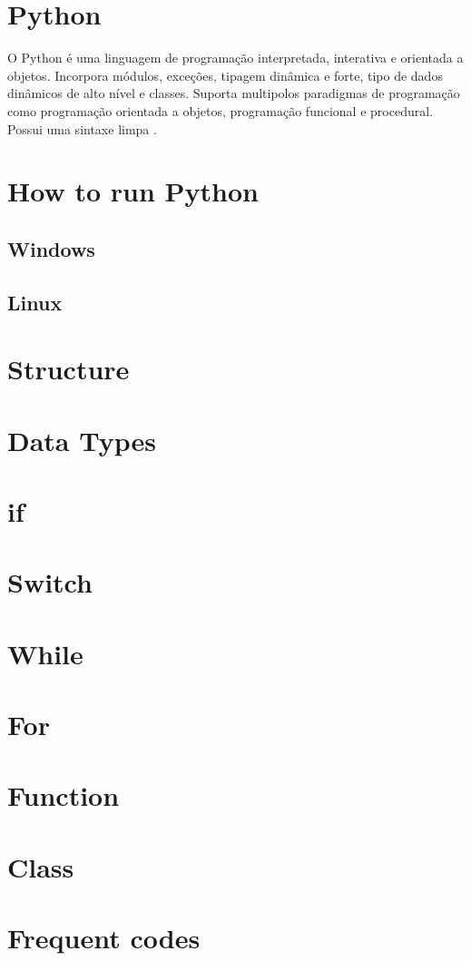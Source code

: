 \chapter{Python}

O Python é uma linguagem de programação interpretada, interativa e orientada a objetos. Incorpora módulos, exceções, tipagem dinâmica e forte, tipo de dados  dinâmicos de alto nível e classes. Suporta multipolos paradigmas de programação como programação orientada a objetos, programação funcional e procedural. Possui uma sintaxe limpa \cite{pythonDocs}.

\chapter{How to run Python}
\section{Windows}
\section{Linux}
\chapter{Structure}
\chapter{Data Types}
\chapter{if}
\chapter{Switch}
\chapter{While}
\chapter{For}
\chapter{Function}
\chapter{Class}
\chapter{Frequent codes}
